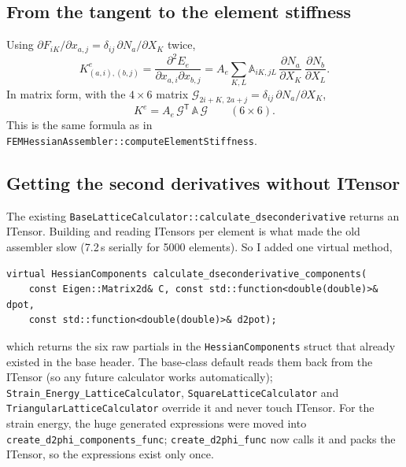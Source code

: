 \documentclass[11pt,a4paper]{article}
\theoremstyle{remark}
\newcommand{\T}{^{\mathsf T}}
\newcommand{\code}[1]{\texttt{#1}}
\begin{document}
\subsection{From the tangent to the element stiffness}

Using $\partial F_{iK}/\partial x_{a,j} = \delta_{ij}\,\partial N_a/\partial X_K$ twice,
\begin{equation}
K^{e}_{(a,i),(b,j)} = \frac{\partial^2 E_e}{\partial x_{a,i}\partial x_{b,j}}
= A_e\sum_{K,L}\mathbb{A}_{iK,jL}\,\frac{\partial N_a}{\partial X_K}\,\frac{\partial N_b}{\partial X_L}.
\end{equation}
In matrix form, with the $4\times6$ matrix $\mathcal{G}_{2i+K,\,2a+j} = \delta_{ij}\,\partial N_a/\partial X_K$,
\begin{equation}
K^{e} = A_e\,\mathcal{G}\T\,\mathbb{A}\,\mathcal{G}\qquad (6\times6).
\label{eq:Ke}
\end{equation}
This is the same formula as in \code{FEMHessianAssembler::\allowbreak{}computeElementStiffness}.

\subsection{Getting the second derivatives without ITensor}

The existing \code{BaseLatticeCalculator::\allowbreak{}calculate\_\allowbreak{}dseconderivative} returns an ITensor. Building
and reading ITensors per element is what made the old assembler slow (7.2\,s serially for
5000 elements). So I added one virtual method,
\begin{lstlisting}
virtual HessianComponents calculate_dseconderivative_components(
    const Eigen::Matrix2d& C, const std::function<double(double)>& dpot,
    const std::function<double(double)>& d2pot);
\end{lstlisting}
which returns the six raw partials in the \code{HessianComponents} struct that already existed
in the base header. The base-class default reads them back from the ITensor (so any future
calculator works automatically); \code{Strain\_\allowbreak{}Energy\_\allowbreak{}LatticeCalculator},
\code{SquareLatticeCalculator} and \code{TriangularLatticeCalculator} override it and never touch
ITensor. For the strain energy, the huge generated expressions were moved into
\code{create\_\allowbreak{}d2phi\_\allowbreak{}components\_\allowbreak{}func}; \code{create\_\allowbreak{}d2phi\_\allowbreak{}func} now calls it and packs the ITensor,
so the expressions exist only once.
\end{document}
